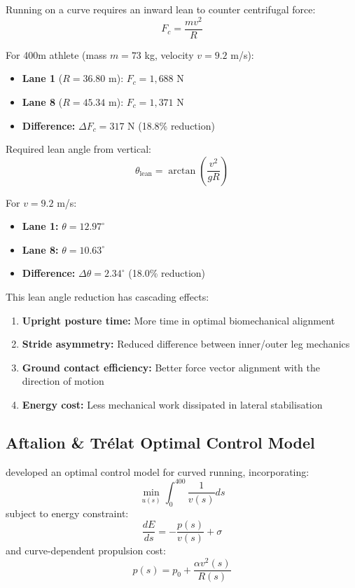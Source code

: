 Running on a curve requires an inward lean to counter centrifugal force:
\begin{equation}
F_c = \frac{mv^2}{R}
\end{equation}

For 400m athlete (mass $m = 73$ kg, velocity $v = 9.2$ m/s):
\begin{itemize}
    \item \textbf{Lane 1} ($R = 36.80$ m): $F_c = 1,688$ N
    \item \textbf{Lane 8} ($R = 45.34$ m): $F_c = 1,371$ N
    \item \textbf{Difference:} $\Delta F_c = 317$ N (18.8\% reduction)
\end{itemize}

Required lean angle from vertical:
\begin{equation}
\theta_{\text{lean}} = \arctan\left(\frac{v^2}{gR}\right)
\end{equation}

For $v = 9.2$ m/s:
\begin{itemize}
    \item \textbf{Lane 1:} $\theta = 12.97^\circ$
    \item \textbf{Lane 8:} $\theta = 10.63^\circ$
    \item \textbf{Difference:} $\Delta\theta = 2.34^\circ$ (18.0\% reduction)
\end{itemize}

This lean angle reduction has cascading effects:
\begin{enumerate}
    \item \textbf{Upright posture time:} More time in optimal biomechanical alignment
    \item \textbf{Stride asymmetry:} Reduced difference between inner/outer leg mechanics
    \item \textbf{Ground contact efficiency:} Better force vector alignment with the direction of motion
    \item \textbf{Energy cost:} Less mechanical work dissipated in lateral stabilisation
\end{enumerate}

\subsection{Aftalion \& Trélat Optimal Control Model}

\citet{Aftalion2020} developed an optimal control model for curved running, incorporating:
\begin{equation}
\min_{u(s)} \int_0^{400} \frac{1}{v(s)} ds
\end{equation}
subject to energy constraint:
\begin{equation}
\frac{dE}{ds} = -\frac{p(s)}{v(s)} + \sigma
\end{equation}
and curve-dependent propulsion cost:
\begin{equation}
p(s) = p_0 + \frac{\alpha v^2(s)}{R(s)}
\end{equation}

